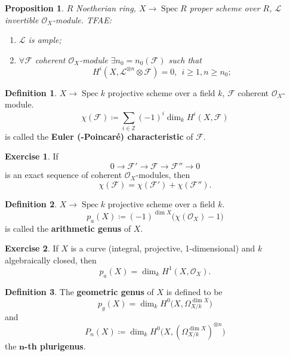 \documentclass[12pt]{article}
\DeclareMathOperator{\Spec}{Spec}
\newtheorem*{proposition}{Proposition}
\theoremstyle{definition}
\newtheorem*{definition}{Definition}
\newtheorem*{exercise}{Exercise}
\theoremstyle{remark}
\newtheorem*{comment}{Comment}
\begin{document}
\begin{comment}
This theorem is proven with the \emph{d\'{e}vissage} technique. It is reduced to the case that $X$ is the projective space, $\mathcal{L}$ is $\mathcal{O}(n)$ with $n>0$, and $\mathcal{F}$ is a quotient of direct sums of $\mathcal{L}$.
\end{comment}

\begin{proposition}
$R$ Noetherian ring, $X\rightarrow\Spec R$ proper scheme over $R$, $\mathcal{L}$ invertible $\mathcal{O}_X$-module. TFAE:
\begin{enumerate}[label=\arabic*)]
\item $\mathcal{L}$ is ample;
\item $\forall \mathcal{F}$ coherent $\mathcal{O}_X$-module $\exists n_0=n_0(\mathcal{F})$ such that
\[H^i(X,\mathcal{L}^{\otimes n}\otimes\mathcal{F})=0,\ \ i\geq1,n\geq n_0;\]
\end{enumerate}
\end{proposition}

\begin{definition}
$X\rightarrow\Spec k$ projective scheme over a field $k$, $\mathcal{F}$ coherent $\mathcal{O}_X$-module.
\[\chi(\mathcal{F})\coloneqq\sum_{i\in\mathbb{Z}}(-1)^i\dim_kH^i(X,\mathcal{F})\]
is called the \textbf{Euler (-Poincar\'{e}) characteristic} of $\mathcal{F}$.
\end{definition}

\begin{exercise}
If
\[0\longrightarrow\mathcal{F}'\longrightarrow\mathcal{F}\longrightarrow\mathcal{F}''\longrightarrow0\]
is an exact sequence of coherent $\mathcal{O}_X$-modules, then
\[\chi(\mathcal{F})=\chi(\mathcal{F}')+\chi(\mathcal{F}'').\]
\end{exercise}

\begin{definition}
$X\rightarrow\Spec k$ projective scheme over a field $k$.
\[p_a(X)\coloneqq(-1)^{\dim X}\big(\chi(\mathcal{O}_X)-1\big)\]
is called the \textbf{arithmetic genus} of $X$.
\end{definition}

\begin{exercise}
If $X$ is a curve (integral, projective, 1-dimensional) and $k$ algebraically closed, then
\[p_a(X)=\dim_kH^1(X,\mathcal{O}_X).\]
\end{exercise}

\begin{definition}
The \textbf{geometric genus} of $X$ is defined to be
\[p_g(X)=\dim_kH^0\big(X,\Omega_{X/k}^{\dim X}\big)\]
and
\[P_n(X)\coloneqq\dim_kH^0(X,(\Omega_{X/k}^{\dim X})^{\otimes n}\big)\]
the $\boldsymbol{n}$\textbf{-th plurigenus}.
\end{definition}
\end{document}
